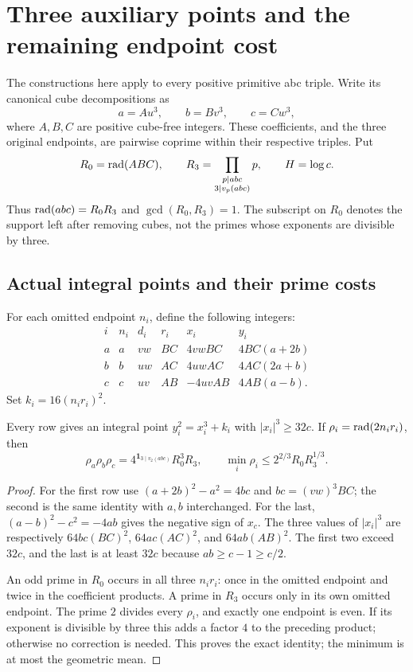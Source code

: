 \section{Three auxiliary points and the remaining endpoint cost}
\label{sec:global-cubic}

The constructions here apply to every positive primitive abc triple.
Write its canonical cube decompositions as
\begin{equation}\label{eq:canonical-cubes}
 a=Au^3,\qquad b=Bv^3,\qquad c=Cw^3,
\end{equation}
where $A,B,C$ are positive cube-free integers. These coefficients, and
the three original endpoints, are pairwise coprime within their respective
triples. Put
\[
 R_0=\operatorname{rad}(ABC),\qquad
 R_3=\prod_{\substack{p\mid abc\\3\mid v_p(abc)}}p,
 \qquad H=\log c.
\]
Thus $\operatorname{rad}(abc)=R_0R_3$ and $\gcd(R_0,R_3)=1$. The subscript on
$R_0$ denotes the support left after removing cubes, not the primes
whose exponents are divisible by three.

\subsection{Actual integral points and their prime costs}

For each omitted endpoint $n_i$, define the following integers:
\[
\begin{array}{c|ccc|cc}
 i&n_i&d_i&r_i&x_i&y_i\\ \hline
 a&a&vw&BC&4vwBC&4BC(a+2b)\\
 b&b&uw&AC&4uwAC&4AC(2a+b)\\
 c&c&uv&AB&-4uvAB&4AB(a-b).
\end{array}
\]
Set $k_i=16(n_i r_i)^2$.
\begin{proposition}\label{prop:three-integral-points}
Every row gives an integral point $y_i^2=x_i^3+k_i$ with
$|x_i|^3\ge32c$. If $\rho_i=\operatorname{rad}(2n_i r_i)$, then
\begin{equation}\label{eq:three-prime-costs}
 \rho_a\rho_b\rho_c
   =4^{\mathbf1_{3\mid v_2(abc)}}R_0^3R_3,
 \qquad
 \min_i\rho_i\le2^{2/3}R_0R_3^{1/3}.
\end{equation}
\end{proposition}
\begin{proof}
For the first row use $(a+2b)^2-a^2=4bc$ and $bc=(vw)^3BC$;
the second is the same identity with $a,b$ interchanged. For the last,
$(a-b)^2-c^2=-4ab$ gives the negative sign of $x_c$.
The three values of $|x_i|^3$ are respectively
$64bc(BC)^2$, $64ac(AC)^2$, and $64ab(AB)^2$.
The first two exceed $32c$, and the last is at least $32c$ because
$ab\ge c-1\ge c/2$.

An odd prime in $R_0$ occurs in all three $n_i r_i$: once in the
omitted endpoint and twice in the coefficient products. A prime in
$R_3$ occurs only in its own omitted endpoint. The prime $2$ divides
every $\rho_i$, and exactly one endpoint is even. If its exponent is
divisible by three this adds a factor $4$ to the preceding product;
otherwise no correction is needed. This proves the exact identity;
the minimum is at most the geometric mean.
\end{proof}

